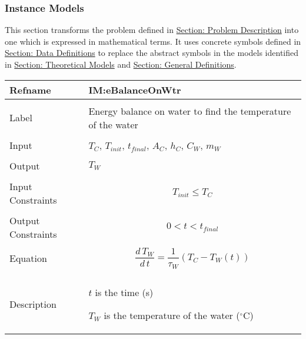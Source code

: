 \documentclass[12pt]{article}
\begin{document}
\subsubsection{Instance Models}
\label{Sec:IMs}
This section transforms the problem defined in \hyperref[Sec:ProbDesc]{Section: Problem Description} into one which is expressed in mathematical terms. It uses concrete symbols defined in \hyperref[Sec:DDs]{Section: Data Definitions} to replace the abstract symbols in the models identified in \hyperref[Sec:TMs]{Section: Theoretical Models} and \hyperref[Sec:GDs]{Section: General Definitions}.
~\newline
\noindent \begin{minipage}{\textwidth}
\begin{tabular}{p{} p{}}
\toprule \textbf{Refname} & \textbf{IM:eBalanceOnWtr}
\label{IM:eBalanceOnWtr}
\\ \midrule \\
Label & Energy balance on water to find the temperature of the water
\\ \midrule \\
Input & ${T_{C}}$, ${T_{init}}$, ${t_{final}}$, ${A_{C}}$, ${h_{C}}$, ${C_{W}}$, ${m_{W}}$
\\ \midrule \\
Output & ${T_{W}}$
\\ \midrule \\
Input Constraints & \begin{dmath}
                    {T_{init}}\leq{}{T_{C}}
                    \end{dmath}
\\ \midrule \\
Output Constraints & \begin{dmath}
                     0<t<{t_{final}}
                     \end{dmath}
\\ \midrule \\
Equation & \begin{dmath}
           \frac{d\,{T_{W}}}{d\,t}=\frac{1}{{τ_{W}}} \left({T_{C}}-{T_{W}}\left(t\right)\right)
           \end{dmath}
\\ \midrule \\
Description & \begin{symbDescription}
              \item{$t$ is the time (s)}
              \item{${T_{W}}$ is the temperature of the water (${}^{\circ}$C)}

\end{symbDescription}
\end{tabular}
\end{minipage}
\end{document}
